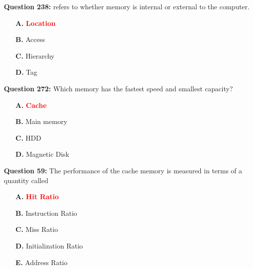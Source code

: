 \documentclass[12pt,a4paper]{article}
\begin{document}
\vspace{0.5cm}

\vspace{0.5cm}

\textbf{Question 238:} \underline{\hspace{1.5cm}} refers to whether memory is internal or external to the computer.

\begin{itemize}
    \item[\textbf{A.}] \textcolor{red}{\textbf{Location}}
    \item[\textbf{B.}] Access
    \item[\textbf{C.}] Hierarchy
    \item[\textbf{D.}] Tag
\end{itemize}

\vspace{0.5cm}

\vspace{0.5cm}

\textbf{Question 272:} Which memory has the fastest speed and smallest capacity?

\begin{itemize}
    \item[\textbf{A.}] \textcolor{red}{\textbf{Cache}}
    \item[\textbf{B.}] Main memory
    \item[\textbf{C.}] HDD
    \item[\textbf{D.}] Magnetic Disk
\end{itemize}

\vspace{0.5cm}

\vspace{0.5cm}

\textbf{Question 59:} The performance of the cache memory is measured in terms of a quantity called \underline{\hspace{1.5cm}}

\begin{itemize}
    \item[\textbf{A.}] \textcolor{red}{\textbf{Hit Ratio}}
    \item[\textbf{B.}] Instruction Ratio
    \item[\textbf{C.}] Miss Ratio
    \item[\textbf{D.}] Initialization Ratio
    \item[\textbf{E.}] Address Ratio
\end{itemize}

\vspace{0.5cm}
\end{document}
